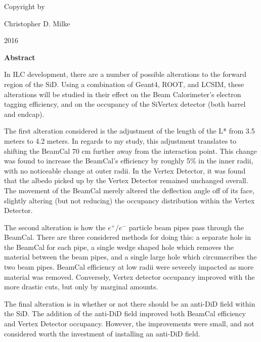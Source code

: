 \documentclass{report}
\begin{document}
    \newpage \begin{center} 
        \vspace*{\fill}
        Copyright \textcopyright by

        Christopher D. Milke 

        2016
        \vspace*{\fill}
    \end{center} \newpage


        \begin{center} \LARGE \textbf{Abstract} \end{center}

        In ILC development, there are a number of possible alterations to the forward region of the SiD. Using a combination of Geant4, ROOT, and LCSIM, these alterations will be studied in their effect on the Beam Calorimeter's electron tagging efficiency, and on the occupancy of the SiVertex detector (both barrel and endcap).

        The first alteration considered is the adjustment of the length of the L* from 3.5 meters to 4.2 meters. In regards to my study, this adjustment translates to shifting the BeamCal 70 cm further away from the interaction point. This change was found to increase the BeamCal's efficiency by roughly 5\% in the inner radii, with no noticeable change at outer radii. In the Vertex Detector, it was found that the albedo picked up by the Vertex Detector remained unchanged overall. The movement of the BeamCal merely altered the deflection angle off of its face, slightly altering (but not reducing) the occupancy distribution within the Vertex Detector.

        The second alteration is how the $e^+/e^-$ particle beam pipes pass through the BeamCal. There are three considered methods for doing this: a separate hole in the BeamCal for each pipe, a single wedge shaped hole which removes the material between the beam pipes, and a single large hole which circumscribes the two beam pipes. BeamCal efficiency at low radii were severely impacted as more material was removed. Conversely, Vertex detector occupancy improved with the more drastic cuts, but only by marginal amounts.

        The final alteration is in whether or not there should be an anti-DiD field within the SiD. The addition of the anti-DiD field improved both BeamCal efficiency and Vertex Detector occupancy. However, the improvements were small, and not considered worth the investment of installing an anti-DiD field.
    \newpage
\end{document}
